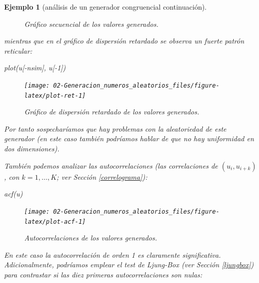 \documentclass[
  10pt,
]{book}
\newenvironment{Shaded}{\begin{snugshade}}{\end{snugshade}}
\newcommand{\DecValTok}[1]{\textcolor[rgb]{0.00,0.00,0.81}{#1}}
\newcommand{\FunctionTok}[1]{\textcolor[rgb]{0.00,0.00,0.00}{#1}}
\newcommand{\NormalTok}[1]{#1}
\newcommand{\SpecialCharTok}[1]{\textcolor[rgb]{0.00,0.00,0.00}{#1}}
\theoremstyle{break}
\newtheorem{example}{Ejemplo}[chapter]
\theoremstyle{nonumberplain}
\begin{document}
\begin{example}[análisis de un generador congruencial continuación]
\begin{figure}[!htbp]
{}

\caption{Gráfico secuencial de los valores generados.}\label{fig:plot-sec}
\end{figure}

mientras que en el gráfico de dispersión retardado se observa un fuerte patrón reticular:

\begin{Shaded}
\begin{Highlighting}[]
\FunctionTok{plot}\NormalTok{(u[}\SpecialCharTok{{-}}\NormalTok{nsim], u[}\SpecialCharTok{{-}}\DecValTok{1}\NormalTok{])}
\end{Highlighting}
\end{Shaded}

\begin{figure}[!htbp]

{\centering \texttt{[image: 02-Generacion\_numeros\_aleatorios\_files/figure-latex/plot-ret-1]} 

}

\caption{Gráfico de dispersión retardado de los valores generados.}\label{fig:plot-ret}
\end{figure}

Por tanto sospecharíamos que hay problemas con la aleatoriedad de este generador (en este caso también podríamos hablar de que no hay uniformidad en dos dimensiones).

También podemos analizar las autocorrelaciones (las correlaciones de \((u_{i},u_{i+k})\), con \(k=1,\ldots,K\); ver Sección \ref{correlograma}):

\begin{Shaded}
\begin{Highlighting}[]
\FunctionTok{acf}\NormalTok{(u)}
\end{Highlighting}
\end{Shaded}

\begin{figure}[!htbp]

{\centering \texttt{[image: 02-Generacion\_numeros\_aleatorios\_files/figure-latex/plot-acf-1]} 

}

\caption{Autocorrelaciones de los valores generados.}\label{fig:plot-acf}
\end{figure}

En este caso la autocorrelación de orden 1 es claramente significativa.
Adicionalmente, podríamos emplear el test de Ljung-Box (ver Sección \ref{ljungbox}) para contrastar si las diez primeras autocorrelaciones son nulas:


\end{example}
\end{document}
